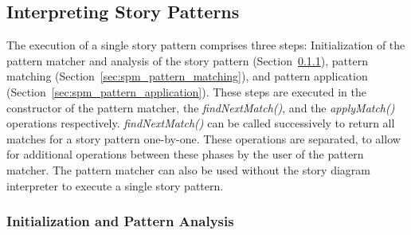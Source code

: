 \subsection{Interpreting Story Patterns}
\label{sec:interpreting_story_patterns}

The execution of a single story pattern comprises three steps:
Initialization of the pattern matcher and analysis of the story pattern (Section~\ref{sec:spm_initialization}),
pattern matching (Section~\ref{sec:spm_pattern_matching}),
and pattern application (Section~\ref{sec:spm_pattern_application}).
These steps are executed in the constructor of the pattern matcher, the \emph{findNextMatch()}, and the \emph{applyMatch()} operations respectively.
\emph{findNextMatch()} can be called successively to return all matches for a story pattern one-by-one.
These operations are separated, to allow for additional operations between these phases by the user of the pattern matcher.
The pattern matcher can also be used without the story diagram interpreter to execute a single story pattern.


\subsubsection{Initialization and Pattern Analysis}
\label{sec:spm_initialization}

